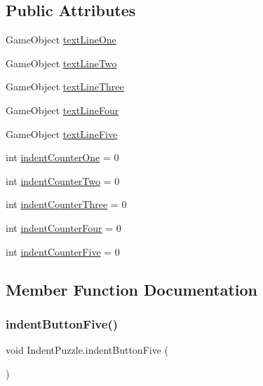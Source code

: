 \subsection*{Public Attributes}
\begin{DoxyCompactItemize}
\item 
Game\+Object \hyperlink{class_indent_puzzle_a4e40070466818e4679b394d5bda86ade}{text\+Line\+One}
\item 
Game\+Object \hyperlink{class_indent_puzzle_ad9cebfab9a44877b5bbed7549fcc08fd}{text\+Line\+Two}
\item 
Game\+Object \hyperlink{class_indent_puzzle_a9089446322d12f009d2f8b97a4c0fecd}{text\+Line\+Three}
\item 
Game\+Object \hyperlink{class_indent_puzzle_a1f2af93e171a1a996f1332be17f5fb49}{text\+Line\+Four}
\item 
Game\+Object \hyperlink{class_indent_puzzle_ac10f8edc26d7c44680c010d0131bae4f}{text\+Line\+Five}
\item 
int \hyperlink{class_indent_puzzle_ad84195fdc4df72f77f9638857240d067}{indent\+Counter\+One} = 0
\item 
int \hyperlink{class_indent_puzzle_a61233af419d8df3e8720411babf513d3}{indent\+Counter\+Two} = 0
\item 
int \hyperlink{class_indent_puzzle_a59902da46bba63163638c8eb871f1e0f}{indent\+Counter\+Three} = 0
\item 
int \hyperlink{class_indent_puzzle_a660de35fb6850ef5c6f88fd93dac427a}{indent\+Counter\+Four} = 0
\item 
int \hyperlink{class_indent_puzzle_abd24d4138f4bb377624e1d1da061857d}{indent\+Counter\+Five} = 0
\end{DoxyCompactItemize}


\subsection{Member Function Documentation}
\mbox{\label{class_indent_puzzle_a6d494b8306dfbdc444d67032f6dbb275}} 
\subsubsection{\texorpdfstring{indent\+Button\+Five()}{indentButtonFive()}}
{\footnotesize\ttfamily void Indent\+Puzzle.\+indent\+Button\+Five (\begin{DoxyParamCaption}{ }\end{DoxyParamCaption})}

